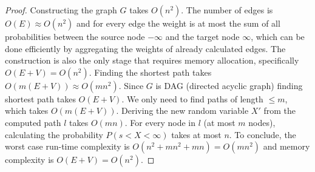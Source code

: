 \documentclass{article}
\begin{document}
\begin{proof}
	Constructing the graph $G$ takes $O(n^2)$. The number of edges is $O(E)\approx O(n^2)$ and for every edge the weight is at most the sum of all probabilities between the source node $-\infty$ and the target node $\infty$, which can be done efficiently by aggregating the weights of already calculated edges. 
	The construction is also the only stage that requires memory allocation, specifically $O(E+V)=O(n^2)$.
	Finding the shortest path takes $O(m(E+V))\approx O(mn^2)$. Since $G$ is DAG (directed acyclic graph) finding shortest path takes $O(E+V)$. We only need to find paths of length $\leq m$, which takes $O(m(E+V))$.
	Deriving the new random variable $X'$ from the computed path $l$ takes $O(mn)$. For every node in $l$ (at most $m$ nodes), calculating the probability $P(s<X<\infty)$ takes at most $n$. 
	To conclude, the worst case run-time complexity is $O(n^2+mn^2+mn)=O(mn^2)$ and memory complexity is $O(E+V)=O(n^2)$.
\end{proof}
\end{document}
